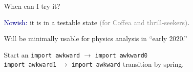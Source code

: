 \documentclass[aspectratio=169]{beamer}
\begin{document}
\begin{frame}{When can I try it?}
\Large
\vspace{-0.25 cm}
\begin{center}
\end{center}

\vspace{0.25 cm}
\begin{center}
\textcolor{darkblue}{Nowish:} it is in a testable state \textcolor{gray}{(for Coffea and thrill-seekers)}.

\vspace{0.75 cm}
Will be minimally usable for physics analysis in ``early 2020.''

\vspace{0.75 cm}
\end{center}

Start an {\normalsize \texttt{import awkward}} $\to$ {\normalsize \texttt{import awkward0}} \\
\phantom{Start an} {\normalsize \texttt{import awkward1}} $\to$ {\normalsize \texttt{import awkward}} transition by spring.
\end{frame}
\end{document}
